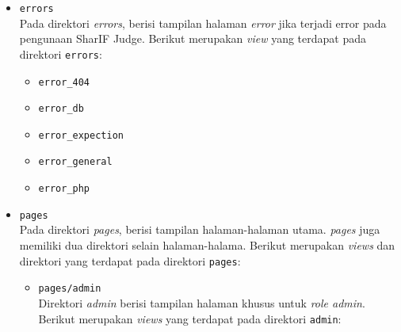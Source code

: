 \begin{itemize}
      \item \verb|errors| \\
            Pada direktori \textit{errors}, berisi tampilan halaman \textit{error} jika terjadi error pada pengunaan SharIF Judge. Berikut merupakan \textit{view} yang terdapat pada direktori \verb|errors|:

            \begin{itemize}
                  \item \verb|error_404|
                  \item \verb|error_db|
                  \item \verb|error_expection|
                  \item \verb|error_general|
                  \item \verb|error_php|
            \end{itemize}

      \item \verb|pages| \\
            Pada direktori \textit{pages}, berisi tampilan halaman-halaman utama. \textit{pages} juga memiliki dua direktori selain halaman-halama. Berikut merupakan \textit{views} dan direktori yang terdapat pada direktori \verb|pages|:

            \begin{itemize}
                  \item \verb|pages/admin| \\
                        Direktori \textit{admin} berisi tampilan halaman khusus untuk \textit{role admin}. Berikut merupakan \textit{views} yang terdapat pada direktori \verb|admin|:


\end{itemize}
\end{itemize}
